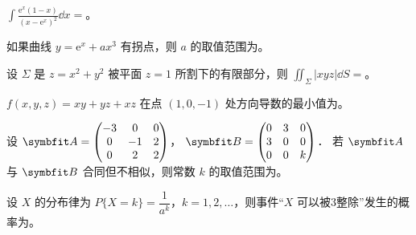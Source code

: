 \begin{question}[index=11]
$\displaystyle\int\frac{\mathrm e^x(1-x)}{(x-\mathrm e^x)^2}\dd x=$\fillin。
\end{question}
\QuestionBreak

\begin{question}[index=12]
如果曲线 $y=\mathrm e^x+ax^3$ 有拐点，则 $a$ 的取值范围为\fillin。
\end{question}
\QuestionBreak

\begin{question}[index=13]
设 $\Sigma$ 是 $z=x^2+y^2$ 被平面 $z=1$ 所割下的有限部分，则 $\displaystyle\iint_\Sigma |xyz|\dd S=$\fillin。
\end{question}
\QuestionBreak

\begin{question}[index=14]
$f(x,y,z)=xy+yz+xz$ 在点 $(1,0,-1)$ 处方向导数的最小值为\fillin。
\end{question}
\QuestionBreak

\begin{question}[index=15]
设 $\symbfit A=\begin{pmatrix}-3&0&0\\0&-1&2\\0&2&2\end{pmatrix}$，
$\symbfit B=\begin{pmatrix}0&3&0\\3&0&0\\0&0&k\end{pmatrix}$．
若 $\symbfit A$ 与 $\symbfit B$ 合同但不相似，则常数 $k$ 的取值范围为\fillin。
\end{question}
\QuestionBreak

\begin{question}[index=16]
设 $X$ 的分布律为 $P\{X=k\}=\dfrac1{a^k}$，$k=1,2,\ldots$，则事件“$X$ 可以被3整除”发生的概率为\fillin。
\end{question}
